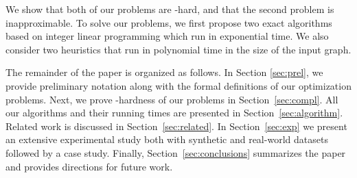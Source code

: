 We show that both of our problems are \np-hard, and that the second problem is inapproximable.
To solve our problems, we first propose two exact algorithms based on integer linear programming which run in exponential time. We also consider two heuristics that run in polynomial time in the size of the input graph.

The remainder of the paper is organized as follows.
In Section \ref{sec:prel}, we provide preliminary notation along with the
formal definitions of our optimization problems. Next, we prove
\np-hardness of our problems in Section~\ref{sec:compl}. All our
algorithms and their running times are presented in Section~\ref{sec:algorithm}. Related work is
discussed in Section~\ref{sec:related}. In Section~\ref{sec:exp} we present an extensive
experimental study both with synthetic and real-world datasets followed by a case study. 
Finally, Section~\ref{sec:conclusions} summarizes the paper and provides directions for future work.


